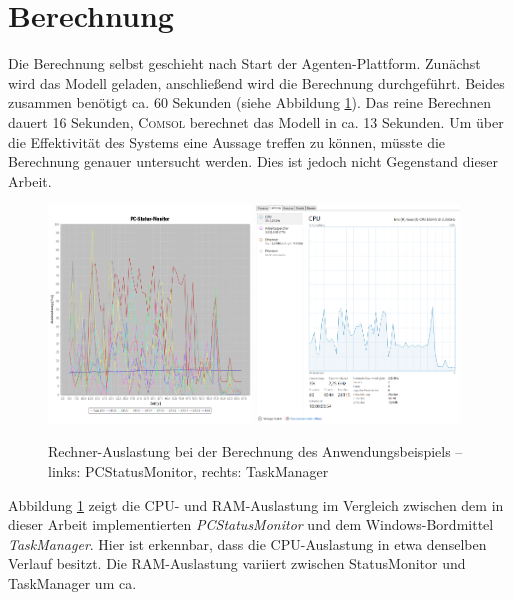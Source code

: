 \documentclass[a4paper,12pt,oneside,openright,onecolumn,final,titlepage,fleqn,ngerman]{scrreprt}
\newcommand{\parag}{\\[2ex]}
\begin{document}
	\section{Berechnung}
	Die Berechnung selbst geschieht nach Start der Agenten-Plattform. Zunächst wird das Modell geladen, anschließend wird die Berechnung durchgeführt. Beides zusammen benötigt ca. 60 Sekunden (siehe Abbildung \ref{fig_bsp_mon}). Das reine Berechnen dauert 16 Sekunden, \textsc{Comsol} berechnet das Modell in ca. 13 Sekunden. Um über die Effektivität des Systems eine Aussage treffen zu können, müsste die Berechnung genauer untersucht werden. Dies ist jedoch nicht Gegenstand dieser Arbeit.\parag{}
	\begin{figure}[ht]
		\centering
		\includegraphics[keepaspectratio=true,width=0.48\textwidth]{res/bsp_statusmon.png}
		\includegraphics[keepaspectratio=true,width=0.48\textwidth]{res/bsp_taskmgr.png}
		\caption[Rechner-Auslastung bei der Berechnung des Anwendungsbeispiels]{Rechner-Auslastung bei der Berechnung des Anwendungsbeispiels -- links: PCStatusMonitor, rechts: TaskManager}
		\label{fig_bsp_mon}
	\end{figure}
	Abbildung \ref{fig_bsp_mon} zeigt die CPU- und RAM-Auslastung im Vergleich zwischen dem in dieser Arbeit implementierten \emph{PCStatusMonitor} und dem Windows-Bord\-mittel \emph{TaskManager}. Hier ist erkennbar, dass die CPU-Auslastung in etwa denselben Verlauf besitzt. Die RAM-Auslastung variiert zwischen StatusMonitor und TaskManager um ca.
\end{document}
